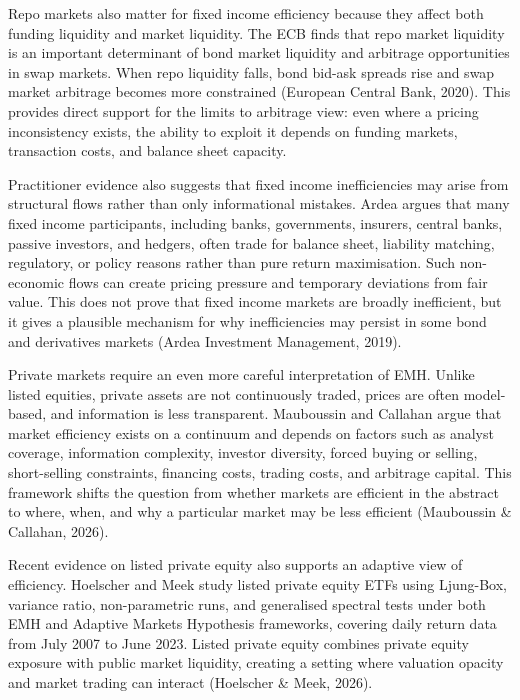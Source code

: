 \documentclass[11pt,a4paper]{article}
\begin{document}
Repo markets also matter for fixed income efficiency because they affect both funding liquidity and market liquidity. The ECB finds that repo market liquidity is an important determinant of bond market liquidity and arbitrage opportunities in swap markets. When repo liquidity falls, bond bid-ask spreads rise and swap market arbitrage becomes more constrained (European Central Bank, 2020). This provides direct support for the limits to arbitrage view: even where a pricing inconsistency exists, the ability to exploit it depends on funding markets, transaction costs, and balance sheet capacity.

Practitioner evidence also suggests that fixed income inefficiencies may arise from structural flows rather than only informational mistakes. Ardea argues that many fixed income participants, including banks, governments, insurers, central banks, passive investors, and hedgers, often trade for balance sheet, liability matching, regulatory, or policy reasons rather than pure return maximisation. Such non-economic flows can create pricing pressure and temporary deviations from fair value. This does not prove that fixed income markets are broadly inefficient, but it gives a plausible mechanism for why inefficiencies may persist in some bond and derivatives markets (Ardea Investment Management, 2019).

Private markets require an even more careful interpretation of EMH. Unlike listed equities, private assets are not continuously traded, prices are often model-based, and information is less transparent. Mauboussin and Callahan argue that market efficiency exists on a continuum and depends on factors such as analyst coverage, information complexity, investor diversity, forced buying or selling, short-selling constraints, financing costs, trading costs, and arbitrage capital. This framework shifts the question from whether markets are efficient in the abstract to where, when, and why a particular market may be less efficient (Mauboussin \& Callahan, 2026).

Recent evidence on listed private equity also supports an adaptive view of efficiency. Hoelscher and Meek study listed private equity ETFs using Ljung-Box, variance ratio, non-parametric runs, and generalised spectral tests under both EMH and Adaptive Markets Hypothesis frameworks, covering daily return data from July 2007 to June 2023. Listed private equity combines private equity exposure with public market liquidity, creating a setting where valuation opacity and market trading can interact (Hoelscher \& Meek, 2026).
\end{document}
